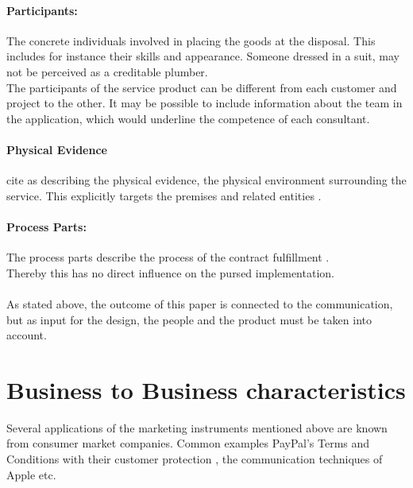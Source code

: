 \paragraph{Participants:}The concrete individuals involved in placing the goods at the disposal. This includes for instance their skills and appearance. Someone dressed in a suit, may not be perceived as a creditable plumber. \\ 
The participants of the service product can be different from each customer and project to the other. It may be possible to include information about the team in the application, which would underline the competence of each consultant.
\paragraph{Physical Evidence}
\textcite[155]{AzilaGbettor2013} cite \textcite{Booms.1981} as describing the physical evidence, the physical environment surrounding the service. This explicitly targets the premises and related entities \parencite[cf.]{Hoepner2015}.
\paragraph{Process Parts:}
The process parts describe the process of the contract fulfillment \parencite{Hoepner2015}.\\
Thereby this has no direct influence on the pursed implementation. 
\paragraph*{} As stated above, the outcome of this paper is connected to the communication, but as input for the design, the people and the product must be taken into account. 
\section{Business to Business characteristics}
Several applications of the marketing instruments mentioned above are known from consumer market companies. Common examples PayPal's Terms and Conditions with their customer protection \parencite[see][]{PayPal}, the communication techniques of Apple etc.
